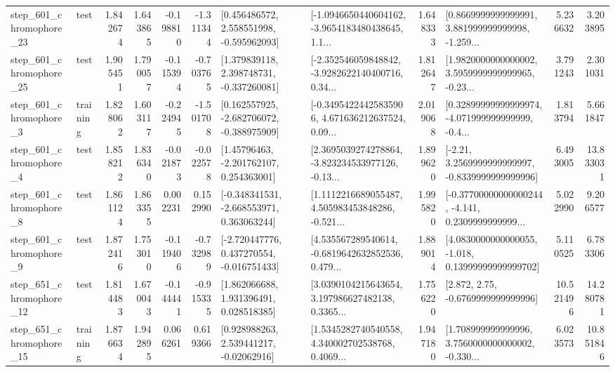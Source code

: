 \begin{tabular}{llrrrrllrlrr}
  step\_601\_chromophore\_23 &      test &      1.842674 &    1.643865 &     -0.198810 & -1.311344 &    [0.456486572, 2.558551998, -0.595962093] &  [-1.0946650440604162, -3.9654183480438645, 1.1... &       1.648333 &  [0.8669999999999991, 3.881999999999998, -1.259... &            5.236632 &          3.203895 \\
  step\_601\_chromophore\_25 &      test &      1.905451 &    1.790057 &     -0.115394 & -0.703765 &    [1.379839118, 2.398748731, -0.337260081] &  [-2.352546059848842, -3.9282622140400716, 0.34... &       1.812647 &  [1.9820000000000002, 3.5959999999999965, -0.23... &            3.791243 &          2.301031 \\
   step\_601\_chromophore\_3 &  training &      1.828062 &    1.603117 &     -0.224945 & -1.501708 &   [0.162557925, -2.682706072, -0.388975909] &  [-0.34954224425835906, 4.671636212637524, 0.09... &       2.019068 &  [0.32899999999999974, -4.071999999999999, -0.4... &            1.813794 &          5.661847 \\
   step\_601\_chromophore\_4 &      test &      1.858212 &    1.836340 &     -0.021873 & -0.022578 &     [1.45796463, -2.201762107, 0.254363001] &  [2.3695039274278864, -3.823234533977126, -0.13... &       1.899620 &   [-2.21, 3.2569999999999997, -0.8339999999999996] &            6.493005 &         13.833031 \\
   step\_601\_chromophore\_8 &      test &      1.861124 &    1.863355 &      0.002231 &  0.152990 &   [-0.348341531, -2.668553971, 0.363063244] &  [1.1112216689055487, 4.505983453848286, -0.521... &       1.995820 &  [-0.37700000000000244, -4.141, 0.2309999999999... &            5.022990 &          9.206577 \\
   step\_601\_chromophore\_9 &      test &      1.872416 &    1.753010 &     -0.119406 & -0.732989 &   [-2.720447776, 0.437270554, -0.016751433] &  [4.535567289540614, -0.6819642632852536, 0.479... &       1.889014 &  [4.0830000000000055, -1.018, 0.13999999999999702] &            5.110525 &          6.783306 \\
  step\_651\_chromophore\_12 &      test &      1.814483 &    1.670043 &     -0.144441 & -0.915335 &     [1.862066688, 1.931396491, 0.028518385] &  [3.0390104215643654, 3.197986627482138, 0.3365... &       1.756220 &                 [2.872, 2.75, -0.6769999999999996] &           10.521496 &         14.280781 \\
  step\_651\_chromophore\_15 &  training &      1.876634 &    1.942895 &      0.066261 &  0.619366 &     [0.928988263, 2.539441217, -0.02062916] &  [1.5345282740540558, 4.340002702538768, 0.4069... &       1.947180 &  [1.708999999999996, 3.7560000000000002, -0.330... &            6.023573 &         10.851846 \\

\end{tabular}
